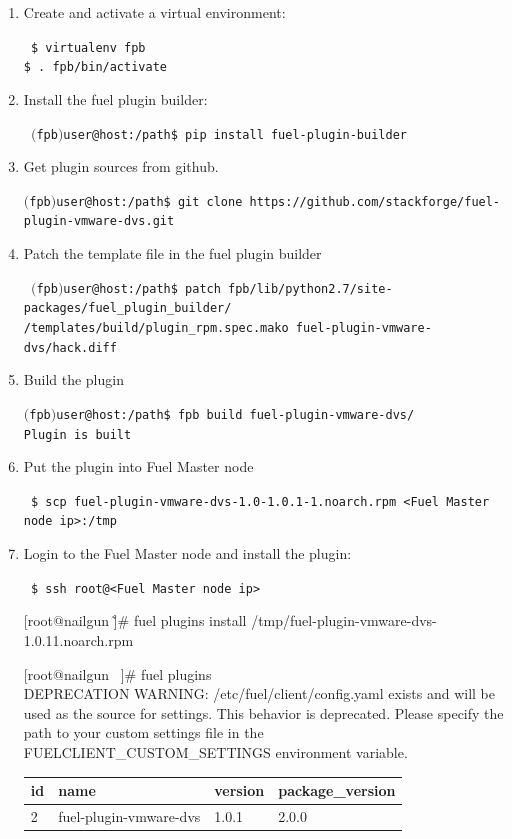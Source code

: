 \documentclass{article}
\begin{document}
\begin{enumerate}

\item Create and activate a virtual environment:

{\tt
\$ virtualenv fpb \\\$ . fpb/bin/activate
}

\item Install the fuel plugin builder:

{\tt
$($fpb$)$user@host:/path\$ pip install fuel-plugin-builder
}

\item Get plugin sources from github.

{\tt $($fpb$)$user@host:/path\$ git clone https://github.com/stackforge/fuel-plugin-vmware-dvs.git}

\item Patch the template file in the fuel plugin builder

{\tt
$($fpb$)$user@host:/path\$ patch  fpb/lib/python2.7/site-packages/fuel\_plugin\_builder/ \\
                /templates/build/plugin\_rpm.spec.mako fuel-plugin-vmware-dvs/hack.diff
}

\item Build the plugin

{\tt $($fpb$)$user@host:/path\$ fpb \textemdash\textemdash build fuel-plugin-vmware-dvs/ \\
Plugin is built}

\item Put the plugin into Fuel Master node

{\tt
\$ scp fuel-plugin-vmware-dvs-1.0-1.0.1-1.noarch.rpm <Fuel Master node ip>:/tmp
}

\item Login to the Fuel Master node and install the plugin:

{\tt
\$ ssh root@<Fuel Master node ip>

[root@nailgun \~]\# fuel plugins \textemdash\textemdash install /tmp/fuel-plugin-vmware-dvs-1.0.1\-1.noarch.rpm

[root@nailgun ~]\# fuel plugins \\
DEPRECATION WARNING: /etc/fuel/client/config.yaml exists and will be used as the source for settings. This behavior is deprecated. Please specify the path to your custom settings file in the FUELCLIENT\_CUSTOM\_SETTINGS environment variable.\\

\begin{tabular}{l|l|l|l}
id & name                   & version & package\_version\\
\hline
2  & fuel-plugin-vmware-dvs & 1.0.1   &2.0.0          \\
\end{tabular}
}

\end{enumerate}
\end{document}
